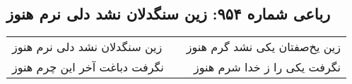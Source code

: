 \begin{center}
\section*{رباعی شماره ۹۵۴: زین سنگدلان نشد دلی نرم هنوز}
\label{sec:0954}
\begin{longtable}{l p{0.5cm} r}
زین سنگدلان نشد دلی نرم هنوز
&&
زین یخ‌صفتان یکی نشد گرم هنوز
\\
نگرفت دباغت آخر این چرم هنوز
&&
نگرفت یکی را ز خدا شرم هنوز
\\
\end{longtable}
\end{center}
